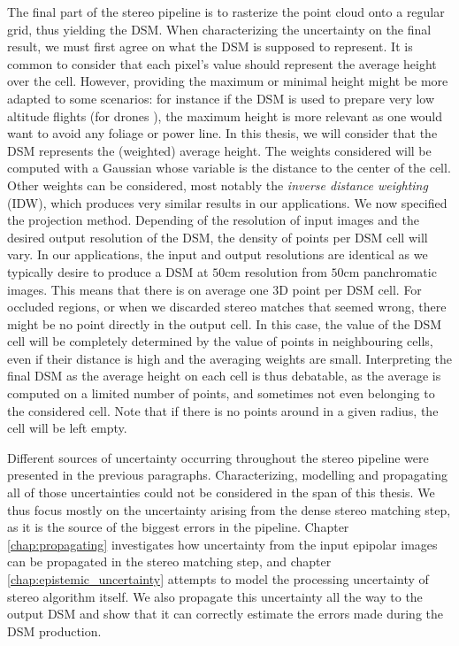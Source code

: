The final part of the stereo pipeline is to rasterize the point cloud onto a regular grid, thus yielding the DSM. When characterizing the uncertainty on the final result, we must first agree on what the DSM is supposed to represent. It is common to consider that each pixel's value should represent the average height over the cell. However, providing the maximum or minimal height might be more adapted to some scenarios: for instance if the DSM is used to prepare very low altitude flights (for drones \etc), the maximum height is more relevant as one would want to avoid any foliage or power line. In this thesis, we will consider that the DSM represents the (weighted) average height. The weights considered will be computed with a Gaussian whose variable is the distance to the center of the cell. Other weights can be considered, most notably the \textit{inverse distance weighting} (IDW), which produces very similar results in our applications. We now specified the projection method. Depending of the resolution of input images and the desired output resolution of the DSM, the density of points per DSM cell will vary. In our applications, the input and output resolutions are identical as we typically desire to produce a DSM at $50$cm resolution from $50$cm panchromatic images. This means that there is on average one 3D point per DSM cell. For occluded regions, or when we discarded stereo matches that seemed wrong, there might be no point directly in the output cell. In this case, the value of the DSM cell will be completely determined by the value of points in neighbouring cells, even if their distance is high and the averaging weights are small. Interpreting the final DSM as the average height on each cell is thus debatable, as the average is computed on a limited number of points, and sometimes not even belonging to the considered cell.  Note that if there is no points around in a given radius, the cell will be left empty. 

Different sources of uncertainty occurring throughout the stereo pipeline were presented in the previous paragraphs. Characterizing, modelling and propagating all of those uncertainties could not be considered in the span of this thesis. We thus focus mostly on the uncertainty arising from the dense stereo matching step, as it is the source of the biggest errors in the pipeline. Chapter \ref{chap:propagating} investigates how uncertainty from the input epipolar images can be propagated in the stereo matching step, and chapter \ref{chap:epistemic_uncertainty} attempts to model the processing uncertainty of stereo algorithm itself. We also propagate this uncertainty all the way to the output DSM and show that it can correctly estimate the errors made during the DSM production. 

